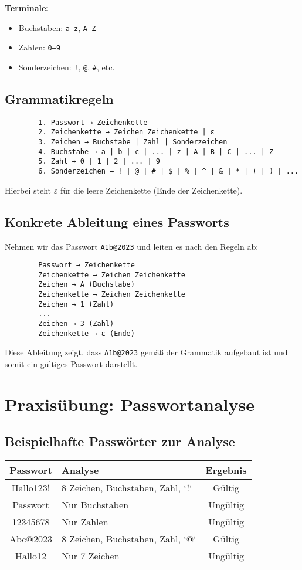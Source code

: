 \documentclass[a4paper,12pt]{article}
\newcommand{\cmark}{\ding{51}} %
\newcommand{\xmark}{\ding{55}} %
\begin{document}
	\textbf{Terminale:}
	\begin{itemize}
		\item Buchstaben: \texttt{a–z}, \texttt{A–Z}
		\item Zahlen: \texttt{0–9}
		\item Sonderzeichen: \texttt{!}, \texttt{@}, \texttt{\#}, etc.
	\end{itemize}
	
	\subsection{Grammatikregeln}
	\begin{verbatim}
		1. Passwort → Zeichenkette
		2. Zeichenkette → Zeichen Zeichenkette | ε
		3. Zeichen → Buchstabe | Zahl | Sonderzeichen
		4. Buchstabe → a | b | c | ... | z | A | B | C | ... | Z
		5. Zahl → 0 | 1 | 2 | ... | 9
		6. Sonderzeichen → ! | @ | # | $ | % | ^ | & | * | ( | ) | ...
	\end{verbatim}
	
	Hierbei steht $\varepsilon$ für die leere Zeichenkette (Ende der Zeichenkette).
	
	\subsection{Konkrete Ableitung eines Passworts}
	Nehmen wir das Passwort \texttt{A1b@2023} und leiten es nach den Regeln ab:
	
	\begin{verbatim}
		Passwort → Zeichenkette
		Zeichenkette → Zeichen Zeichenkette
		Zeichen → A (Buchstabe)
		Zeichenkette → Zeichen Zeichenkette
		Zeichen → 1 (Zahl)
		...
		Zeichen → 3 (Zahl)
		Zeichenkette → ε (Ende)
	\end{verbatim}
	
	Diese Ableitung zeigt, dass \texttt{A1b@2023} gemäß der Grammatik aufgebaut ist und somit ein gültiges Passwort darstellt.
	
	\section{Praxisübung: Passwortanalyse}
	
	\subsection{Beispielhafte Passwörter zur Analyse}
	\begin{center}
		\begin{tabular}{|c|l|c|}
			\hline
			\textbf{Passwort} & \textbf{Analyse} & \textbf{Ergebnis} \\
			\hline
			Hallo123! & 8 Zeichen, Buchstaben, Zahl, `!` & \cmark Gültig \\
			Passwort  & Nur Buchstaben & \xmark Ungültig \\
			12345678  & Nur Zahlen & \xmark Ungültig \\
			Abc@2023  & 8 Zeichen, Buchstaben, Zahl, `@` & \cmark Gültig \\
			Hallo12   & Nur 7 Zeichen & \xmark Ungültig \\
			\hline
		\end{tabular}
	\end{center}
	
\end{document}
